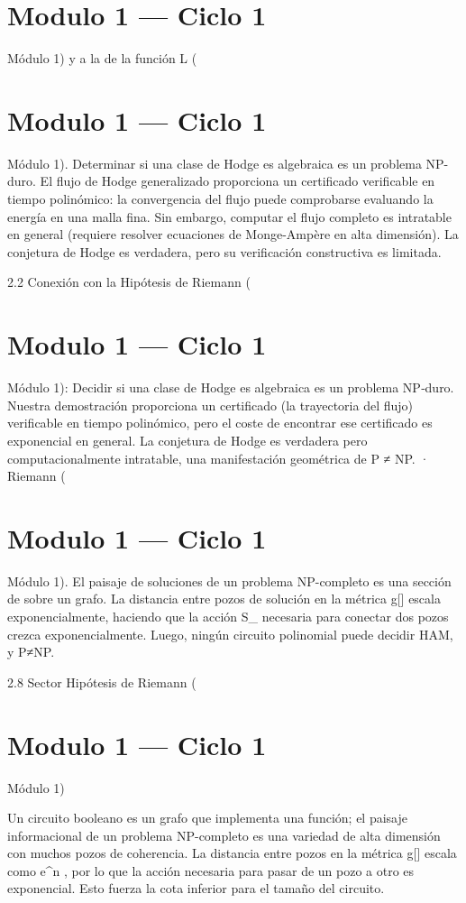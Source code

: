 \documentclass[12pt,twoside]{book}
\begin{document}
\chapter{Modulo 1 — Ciclo 1}
Módulo 1) y a la de la función L (

\chapter{Modulo 1 — Ciclo 1}
Módulo 1).
Determinar si una clase de Hodge es algebraica es un problema NP-duro. El flujo de Hodge generalizado proporciona un certificado verificable en tiempo polinómico: la convergencia del flujo puede comprobarse evaluando la energía en una malla fina. Sin embargo, computar el flujo completo es intratable en general (requiere resolver ecuaciones de Monge-Ampère en alta dimensión). La conjetura de Hodge es verdadera, pero su verificación constructiva es limitada.

2.2 Conexión con la Hipótesis de Riemann (

\chapter{Modulo 1 — Ciclo 1}
Módulo 1): Decidir si una clase de Hodge es algebraica es un problema NP‑duro. Nuestra demostración proporciona un certificado (la trayectoria del flujo) verificable en tiempo polinómico, pero el coste de encontrar ese certificado es exponencial en general. La conjetura de Hodge es verdadera pero computacionalmente intratable, una manifestación geométrica de P ≠ NP.
· Riemann (

\chapter{Modulo 1 — Ciclo 1}
Módulo 1).
El paisaje de soluciones de un problema NP-completo es una sección de \rho sobre un grafo. La distancia entre pozos de solución en la métrica g[\rho] escala exponencialmente, haciendo que la acción S_{} necesaria para conectar dos pozos crezca exponencialmente. Luego, ningún circuito polinomial puede decidir HAM, y P≠NP.

2.8 Sector Hipótesis de Riemann (

\chapter{Modulo 1 — Ciclo 1}
Módulo 1)

Un circuito booleano es un grafo que implementa una función; el paisaje informacional de un problema NP-completo es una variedad de alta dimensión con muchos pozos de coherencia. La distancia entre pozos en la métrica  g[\rho]  escala como  e^n , por lo que la acción necesaria para pasar de un pozo a otro es exponencial. Esto fuerza la cota inferior para el tamaño del circuito.
\end{document}
